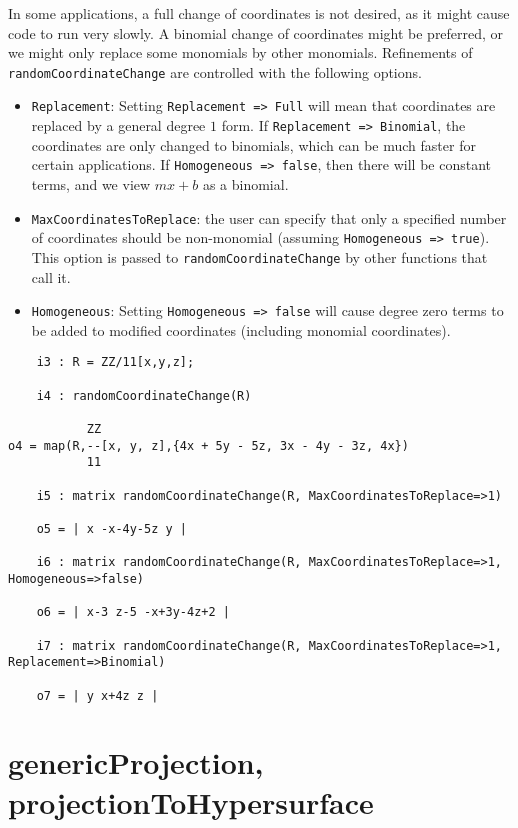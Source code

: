 \documentclass[11pt]{amsart}
\theoremstyle{definition}
\begin{document}
	In some applications, a full change of coordinates is not desired, as it might cause code to run very slowly.  A binomial change of coordinates might be preferred, or we might only replace some monomials by other monomials.  
	Refinements of {\tt randomCoordinateChange} are controlled with the following options.
	
	\begin{itemize}
		\item {\tt Replacement}: Setting {\tt Replacement => Full} will mean that coordinates are replaced by a general degree $1$ form.  If {\tt Replacement => Binomial}, the coordinates are only changed to binomials, which can be much faster for certain applications. If {\tt Homogeneous => false}, then there will be constant terms, and we view $mx + b$ as a binomial.
		\item {\tt MaxCoordinatesToReplace}: the user can specify that only a specified number of coordinates should be non-monomial (assuming {\tt Homogeneous => true}).  
		This option is passed to {\tt randomCoordinateChange} by other functions that call it. 		
		\item {\tt Homogeneous}:  Setting {\tt Homogeneous => false} will cause degree zero terms to be added to modified coordinates (including monomial coordinates).		
	\end{itemize} 

	{{\small\color{blue}
	\begin{verbatim}
	i3 : R = ZZ/11[x,y,z];

	i4 : randomCoordinateChange(R)

           ZZ
o4 = map(R,--[x, y, z],{4x + 5y - 5z, 3x - 4y - 3z, 4x})                     
           11

	i5 : matrix randomCoordinateChange(R, MaxCoordinatesToReplace=>1)

	o5 = | x -x-4y-5z y |

	i6 : matrix randomCoordinateChange(R, MaxCoordinatesToReplace=>1, Homogeneous=>false)

	o6 = | x-3 z-5 -x+3y-4z+2 |

	i7 : matrix randomCoordinateChange(R, MaxCoordinatesToReplace=>1, Replacement=>Binomial)

	o7 = | y x+4z z |
	\end{verbatim}}
	}
	  

\section{genericProjection, projectionToHypersurface}\label{projectionfunctions}
\end{document}
